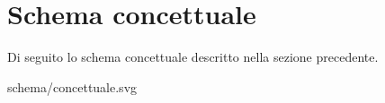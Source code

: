 \section{Schema concettuale}
Di seguito lo schema concettuale descritto nella sezione
precedente.

\begin{center}
	
	{schema/concettuale.svg}
\end{center}
\newpage

